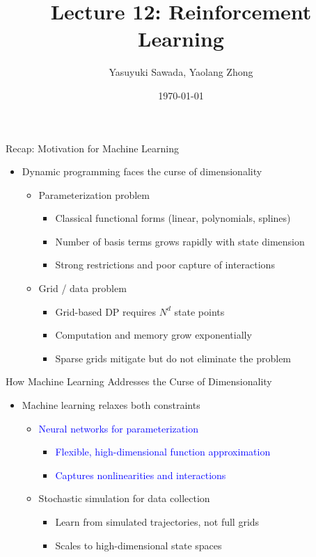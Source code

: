 \documentclass[aspectratio=169]{beamer}
\title{Lecture 12: Reinforcement Learning}
\author{Yasuyuki Sawada, Yaolang Zhong}
\institute{University of Tokyo\\
  \small \texttt{\href{mailto:yaolang.zhong@e.u-tokyo.ac.jp}{yaolang.zhong@e.u-tokyo.ac.jp}}}
\date{\today}
\newcommand{\1}{\mathbf{1}}
\begin{document}
\begin{frame}
\titlepage  
\end{frame}



\begin{frame}{Recap: Motivation for Machine Learning}
  \begin{itemize}
      \item Dynamic programming faces the curse of dimensionality
      \begin{itemize}
          \item Parameterization problem
          \begin{itemize}
              \item Classical functional forms (linear, polynomials, splines)
              \item Number of basis terms grows rapidly with state dimension
              \item Strong restrictions and poor capture of interactions
          \end{itemize}
          \item Grid / data problem
          \begin{itemize}
              \item Grid-based DP requires $N^d$ state points
              \item Computation and memory grow exponentially
              \item Sparse grids mitigate but do not eliminate the problem
          \end{itemize}
      \end{itemize}
  \end{itemize}
  \end{frame}

  \begin{frame}{How Machine Learning Addresses the Curse of Dimensionality}
    \begin{itemize}
        \item Machine learning relaxes both constraints
        \begin{itemize}
            \item \textcolor{blue}{Neural networks for parameterization}
            \begin{itemize}
                \item \textcolor{blue}{Flexible, high-dimensional function approximation}
                \item \textcolor{blue}{Captures nonlinearities and interactions}
            \end{itemize}
            \item Stochastic simulation for data collection
            \begin{itemize}
                \item Learn from simulated trajectories, not full grids
                \item Scales to high-dimensional state spaces
            \end{itemize}
        \end{itemize}
    \end{itemize}
    \end{frame}
\end{document}
